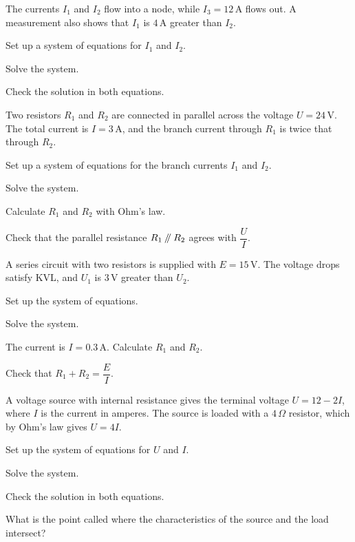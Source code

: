 The currents $I_1$ and $I_2$ flow into a node, while $I_3 = 12\,\text{A}$ flows out. A measurement
also shows that $I_1$ is $4\,\text{A}$ greater than $I_2$.
\begin{parts}
  \item Set up a system of equations for $I_1$ and $I_2$.
  \item Solve the system.
  \item Check the solution in both equations.
\end{parts}

Two resistors $R_1$ and $R_2$ are connected in parallel across the voltage $U = 24\,\text{V}$. The
total current is $I = 3\,\text{A}$, and the branch current through $R_1$ is twice that through
$R_2$.
\begin{parts}
  \item Set up a system of equations for the branch currents $I_1$ and $I_2$.
  \item Solve the system.
  \item Calculate $R_1$ and $R_2$ with Ohm's law.
  \item Check that the parallel resistance $R_1 \mathbin{/\mkern-5mu/} R_2$ agrees with $\dfrac{U}{I}$.
\end{parts}

A series circuit with two resistors is supplied with $E = 15\,\text{V}$. The voltage drops satisfy
KVL, and $U_1$ is $3\,\text{V}$ greater than $U_2$.
\begin{parts}
  \item Set up the system of equations.
  \item Solve the system.
  \item The current is $I = 0.3\,\text{A}$. Calculate $R_1$ and $R_2$.
  \item Check that $R_1 + R_2 = \dfrac{E}{I}$.
\end{parts}

A voltage source with internal resistance gives the terminal voltage $U = 12 - 2I$, where $I$ is
the current in amperes. The source is loaded with a $4\,\Omega$ resistor, which by Ohm's law gives
$U = 4I$.
\begin{parts}
  \item Set up the system of equations for $U$ and $I$.
  \item Solve the system.
  \item Check the solution in both equations.
  \item What is the point called where the characteristics of the source and the load intersect?
\end{parts}


